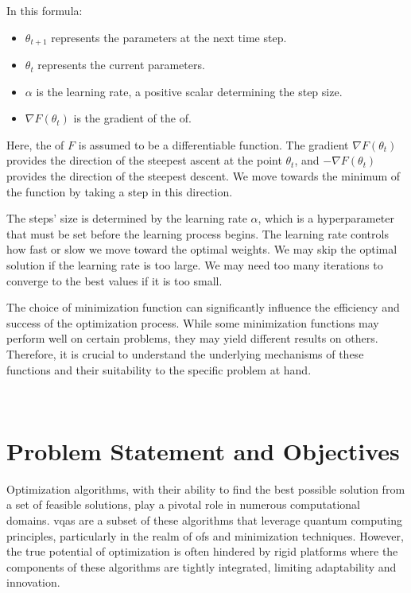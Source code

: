 \documentclass[
  a4paper,  %
  twoside,  %
  bibliography=totoc,
  headsepline,
  cleardoublepage=empty,
  parskip=half,
  draft=false
]{scrbook}
\begin{document}
In this formula:

\begin{itemize}
  \item \(\theta_{t+1}\) represents the parameters at the next time step.
  \item \(\theta_t\) represents the current parameters.
  \item \(\alpha\) is the learning rate, a positive scalar determining the step size.
  \item \(\nabla F(\theta_t)\) is the gradient of the \gls{of}.
\end{itemize}

Here, the \gls{of} \(F\) is assumed to be a differentiable function.
The gradient \(\nabla F(\theta_t)\) provides the direction of the steepest ascent at the point \(\theta_t\), and \(-\nabla F(\theta_t)\) provides the direction of the steepest descent.
We move towards the minimum of the function by taking a step in this direction.

The steps' size is determined by the learning rate \(\alpha\), which is a hyperparameter that must be set before the learning process begins.
The learning rate controls how fast or slow we move toward the optimal weights.
We may skip the optimal solution if the learning rate is too large.
We may need too many iterations to converge to the best values if it is too small.

The choice of minimization function can significantly influence the efficiency and success of the optimization process.
While some minimization functions may perform well on certain problems, they may yield different results on others.
Therefore, it is crucial to understand the underlying mechanisms of these functions and their suitability to the specific problem at hand.

\
\chapter{Problem Statement and Objectives}
\label{chap:problem}

Optimization algorithms, with their ability to find the best possible solution from a set of feasible solutions, play a pivotal role in numerous computational domains.
\glspl{vqa} are a subset of these algorithms that leverage quantum computing principles, particularly in the realm of \glspl{of} and minimization techniques.
However, the true potential of optimization is often hindered by rigid platforms where the components of these algorithms are tightly integrated, limiting adaptability and innovation.
\end{document}
